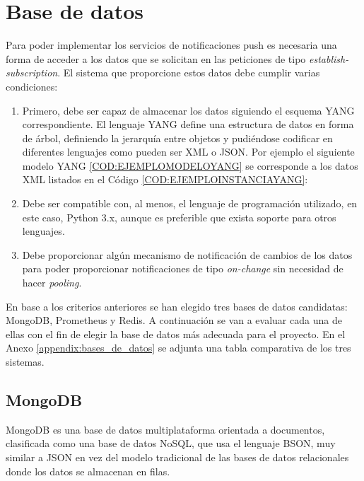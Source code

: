 
\section{Base de datos}

Para poder implementar los servicios de notificaciones push es necesaria una forma de acceder a los
datos que se solicitan en las peticiones de tipo \textit{establish-subscription}. El sistema que 
proporcione estos datos debe cumplir varias condiciones:

\begin{enumerate}
    \item Primero, debe ser capaz de almacenar los datos siguiendo el esquema YANG correspondiente. 
    El lenguaje YANG define una estructura de datos en forma de árbol, definiendo la jerarquía entre
    objetos y pudiéndose codificar en diferentes lenguajes como pueden ser \gls{XML} o \gls{JSON}.
    Por ejemplo el siguiente modelo YANG \ref{COD:EJEMPLOMODELOYANG} se corresponde a los datos \gls{XML}
    listados en el Código \ref{COD:EJEMPLOINSTANCIAYANG}:

   

    \item Debe ser compatible con, al menos, el lenguaje de programación utilizado, en este caso,
    Python 3.x, aunque es preferible que exista soporte para otros lenguajes.
    
    \item Debe proporcionar algún mecanismo de notificación de cambios de los datos para poder
    proporcionar notificaciones de tipo \textit{on-change} sin necesidad de hacer \textit{pooling}.
\end{enumerate}

En base a los criterios anteriores se han elegido tres bases de datos candidatas: MongoDB,
Prometheus y Redis. A continuación se van a evaluar cada una de ellas con el fin de elegir la base de datos más adecuada para el proyecto. En el Anexo \ref{appendix:bases_de_datos} se adjunta una tabla comparativa de los tres sistemas.

\subsection{MongoDB}
MongoDB es una base de datos multiplataforma orientada a documentos, clasificada como una base de 
datos NoSQL, que usa el lenguaje BSON, muy similar a JSON en vez del modelo tradicional de las 
bases de datos relacionales donde los datos se almacenan en filas. 


